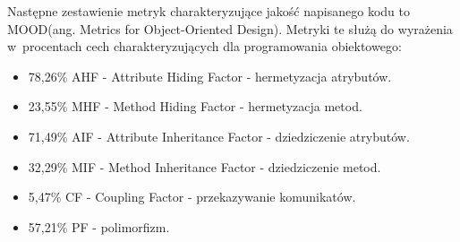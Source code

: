 Następne zestawienie metryk charakteryzujące jakość napisanego kodu to MOOD(ang. Metrics for Object-Oriented Design). Metryki te służą do wyrażenia w~procentach cech charakteryzujących dla programowania obiektowego:
\begin{itemize}
 \item 78,26\% AHF - Attribute Hiding Factor - hermetyzacja atrybutów.
 \item 23,55\% MHF - Method Hiding Factor - hermetyzacja metod.
 \item 71,49\% AIF - Attribute Inheritance Factor - dziedziczenie atrybutów.
 \item 32,29\% MIF - Method Inheritance Factor - dziedziczenie metod.
 \item 5,47\% CF - Coupling Factor - przekazywanie komunikatów.
 \item 57,21\% PF - polimorfizm.
\end{itemize}

